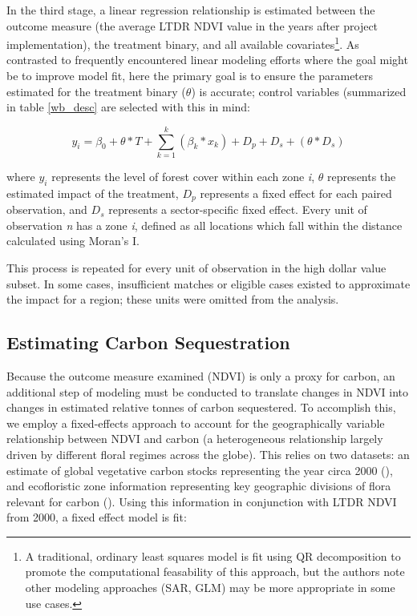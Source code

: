 \documentclass[sustainability,article,submit,moreauthors,pdftex,10pt,a4paper]{mdpi}
\begin{document}
In the third stage, a linear regression relationship is estimated between the outcome measure (the average LTDR NDVI value in the years after project implementation), the treatment binary, and all available covariates\footnote{A traditional, ordinary least squares model is fit using QR decomposition to promote the computational feasability of this approach, but the authors note other modeling approaches (SAR, GLM) may be more appropriate in some use cases.}.  As contrasted to frequently encountered linear modeling efforts where the goal might be to improve model fit, here the primary goal is to ensure the parameters estimated for the treatment binary ($\theta$) is accurate; control variables (summarized in table \ref{wb_desc} are selected with this in mind:

\begin{equation}
y_i = \beta_{0} + \theta * T + \sum_{k=1}^{k}(\beta_{k}*x_{k}) + D_{p} + D_{s} + (\theta * D_{s})
\label{EQgwr}
\end{equation}

where \begin{math}y_{i}\end{math} represents the level of forest cover within each zone \textit{i}, \begin{math}\theta\end{math} represents the estimated impact of the treatment, \begin{math}D_{p}\end{math} represents a fixed effect for each paired observation, and \begin{math}D_{s}\end{math} represents a sector-specific fixed effect.
Every unit of observation \textit{n} has a zone \textit{i}, defined as all locations which fall within the distance calculated using Moran's I.
\par
This process is repeated for every unit of observation in the high dollar value subset.  
In some cases, insufficient matches or eligible cases existed to approximate the impact for a region; these units were omitted from the analysis.

\subsection{Estimating Carbon Sequestration}
Because the outcome measure examined (NDVI) is only a proxy for carbon, an additional step of modeling must be conducted to translate changes in NDVI into changes in estimated relative tonnes of carbon sequestered. To accomplish this, we employ a fixed-effects approach to account for the geographically variable relationship between NDVI and carbon (a heterogeneous relationship largely driven by different floral regimes across the globe). This relies on two datasets: an estimate of global vegetative carbon stocks representing the year circa 2000 (\cite{saatchi_benchmark_2011}), and ecofloristic zone information representing key geographic divisions of flora relevant for carbon (\cite{ruesch_new_2008}). Using this information in conjunction with LTDR NDVI from 2000, a fixed effect model is fit:
\end{document}
